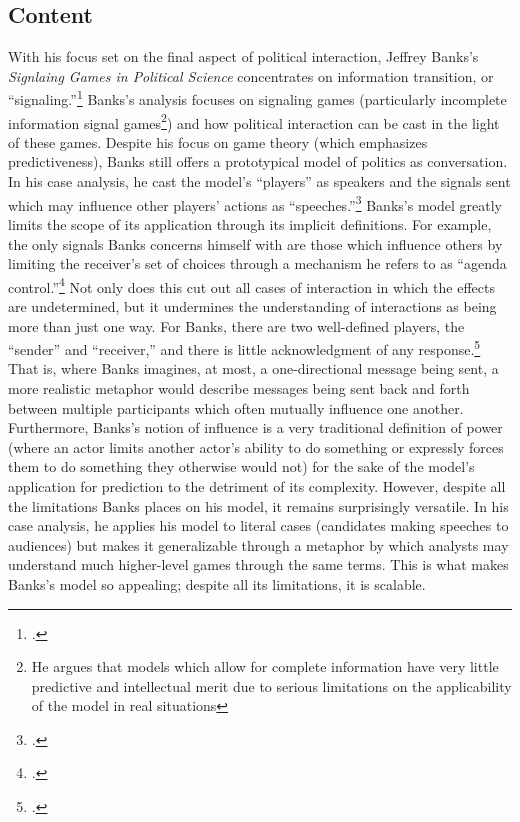 \documentclass{article}
\begin{document}
\subsection{Content}
With his focus set on the final aspect of political interaction, Jeffrey Banks's \emph{Signlaing Games in Political Science} concentrates on information transition, or ``signaling.''\footcite{banks91} 
Banks's analysis focuses on signaling games (particularly incomplete information signal games\footnote{He argues that models which allow for complete information have very little predictive and intellectual merit due to serious limitations on the applicability of the model in real situations}) and how political interaction can be cast in the light of these games. 
Despite his focus on game theory (which emphasizes predictiveness), Banks still offers a prototypical model of politics as conversation. 
In his case analysis, he cast the model's ``players'' as speakers and the signals sent which may influence other players' actions as ``speeches.''\footcite[37]{banks91} 
Banks's model greatly limits the scope of its application through its implicit definitions. 
For example, the only signals Banks concerns himself with are those which influence others by limiting the receiver's set of choices through a mechanism he refers to as ``agenda control.''\footcite[3]{banks91} 
Not only does this cut out all cases of interaction in which the effects are undetermined, but it undermines the understanding of interactions as being more than just one way. 
For Banks, there are two well-defined players, the ``sender'' and ``receiver,'' and there is little acknowledgment of any response.\footcite[4]{banks91} 
That is, where Banks imagines, at most, a one-directional message being sent, a more realistic metaphor would describe messages being sent back and forth between multiple participants which often mutually influence one another. 
Furthermore, Banks's notion of influence is a very traditional definition of power (where an actor limits another actor's ability to do something or expressly forces them to do something they otherwise would not) for the sake of the model's application for prediction to the detriment of its complexity. 
However, despite all the limitations Banks places on his model, it remains surprisingly versatile. 
In his case analysis, he applies his model to literal cases (candidates making speeches to audiences) but makes it generalizable through a metaphor by which analysts may understand much higher-level games through the same terms. 
This is what makes Banks's model so appealing; despite all its limitations, it is scalable.
\end{document}
